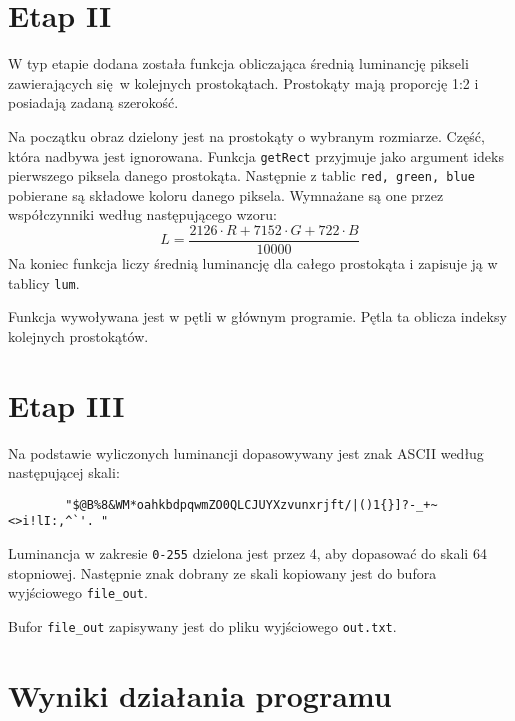 \documentclass[polish, 11pt]{article}
\begin{document}
    

\section{Etap II}
    W typ etapie dodana została funkcja obliczająca średnią luminancję pikseli zawierających się w kolejnych prostokątach.
    Prostokąty mają proporcję 1:2 i posiadają zadaną szerokość.
    
    Na początku obraz dzielony jest na prostokąty o wybranym rozmiarze.
    Część, która nadbywa jest ignorowana.
    Funkcja \verb|getRect| przyjmuje jako argument ideks pierwszego piksela danego prostokąta.
    Następnie z tablic \verb|red, green, blue| pobierane są składowe koloru danego piksela.
    Wymnażane są one przez współczynniki według następującego wzoru:
    \begin{displaymath}
        L = \frac{2126\cdot R+7152\cdot G+722\cdot B}{10000}
    \end{displaymath}
    Na koniec funkcja liczy średnią luminancję dla całego prostokąta i zapisuje ją w tablicy \verb|lum|.

    Funkcja wywoływana jest w pętli w głównym programie.
    Pętla ta oblicza indeksy kolejnych prostokątów.

    
    

\section{Etap III}
    Na podstawie wyliczonych luminancji dopasowywany jest znak ASCII według następującej skali:\\
    \begin{verbatim}
        "$@B%8&WM*oahkbdpqwmZO0QLCJUYXzvunxrjft/|()1{}]?-_+~<>i!lI:,^`'. "
    \end{verbatim}
    Luminancja w zakresie \verb|0-255| dzielona jest przez 4, aby dopasować do skali 64 stopniowej.
    Następnie znak dobrany ze skali kopiowany jest do bufora wyjściowego \verb|file_out|.

    Bufor \verb|file_out| zapisywany jest do pliku wyjściowego \verb|out.txt|.
    
    

\section{Wyniki działania programu}
\end{document}
